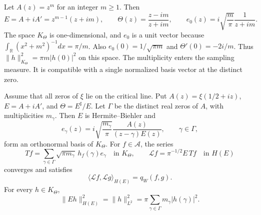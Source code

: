 \documentclass[11pt]{article}
\begin{document}
\begin{example}\label{ex:multiple}
Let $A(z)=z^m$ for an integer $m\ge1$. Then
\[
 E=A+iA'=z^{m-1}(z+im),\qquad
 \Theta(z)=\frac{z-im}{z+im},\qquad
 e_0(z)=i\sqrt{\frac m\pi}\frac1{z+im}.
\]
The space $K_\Theta$ is one-dimensional, and $e_0$ is a unit vector because
$\int_{\mathbb R}(x^2+m^2)^{-1}dx=\pi/m$.
Also $e_0(0)=1/\sqrt{\pi m}$ and $\Theta'(0)=-2i/m$.
Thus $\|h\|_{K_\Theta}^2=\pi m|h(0)|^2$ on this space.
The multiplicity enters the sampling measure.
It is compatible with a single normalized basis vector at the distinct zero.
\end{example}

\begin{theorem}\label{thm:db}
Assume that all zeros of $\xi$ lie on the critical line.
Put $A(z)=\xi(1/2+iz)$, $E=A+iA'$, and $\Theta=E^\sharp/E$.
Let $\Gamma$ be the distinct real zeros of $A$, with multiplicities $m_\gamma$.
Then $E$ is Hermite--Biehler and
\begin{equation}\label{eq:basis}
 e_\gamma(z)=i\sqrt{\frac{m_\gamma}{\pi}}
       \frac{A(z)}{(z-\gamma)E(z)},\qquad \gamma\in\Gamma,
\end{equation}
form an orthonormal basis of $K_\Theta$.
For $f\in\mathscr A$, the series
\begin{equation}\label{eq:db-map}
 T f=\sum_{\gamma\in\Gamma}\sqrt{\pi m_\gamma}\,
              h_f(\gamma)e_\gamma\quad\text{in }K_\Theta,
 \qquad \mathcal L f=\pi^{-1/2}E\,Tf\quad\text{in }H(E)
\end{equation}
converges and satisfies
\begin{equation}\label{eq:db-pairing}
 \langle\mathcal L f,\mathcal L g\rangle_{H(E)}=q_W(f,g).
\end{equation}
For every $h\in K_\Theta$,
\begin{equation}\label{eq:sampling-norm}
 \|Eh\|_{H(E)}^2=\|h\|_{L^2}^2
            =\pi\sum_{\gamma\in\Gamma}m_\gamma|h(\gamma)|^2.
\end{equation}
\end{theorem}
\end{document}
